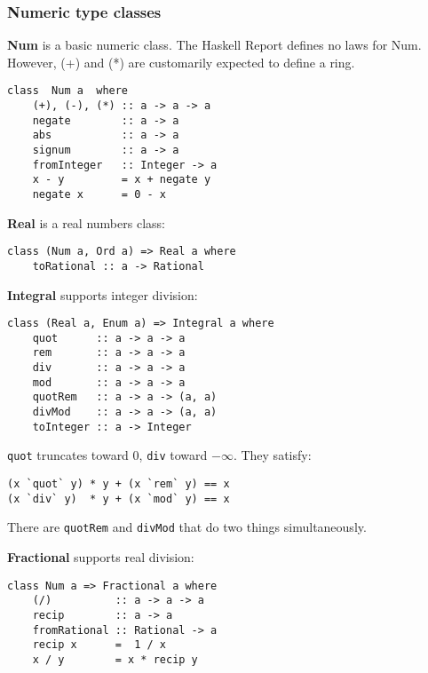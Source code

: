 %

\subsubsection{Numeric type classes}

\textbf{Num} is a basic numeric class.
The Haskell Report defines no laws for Num.
However, (+) and (*) are customarily expected to define a ring.
\begin{verbatim}
class  Num a  where
    (+), (-), (*) :: a -> a -> a
    negate        :: a -> a
    abs           :: a -> a
    signum        :: a -> a
    fromInteger   :: Integer -> a
    x - y         = x + negate y
    negate x      = 0 - x
\end{verbatim}

\textbf{Real} is a real numbers class:
\begin{verbatim}
class (Num a, Ord a) => Real a where
    toRational :: a -> Rational 
\end{verbatim}

\textbf{Integral} supports integer division:
\begin{verbatim}
class (Real a, Enum a) => Integral a where
    quot      :: a -> a -> a
    rem       :: a -> a -> a
    div       :: a -> a -> a
    mod       :: a -> a -> a
    quotRem   :: a -> a -> (a, a) 
    divMod    :: a -> a -> (a, a) 
    toInteger :: a -> Integer 
\end{verbatim}

\texttt{quot} truncates toward $0$, \texttt{div} toward $-\infty$.
They satisfy:
\begin{verbatim}
(x `quot` y) * y + (x `rem` y) == x
(x `div` y)  * y + (x `mod` y) == x
\end{verbatim}

There are \texttt{quotRem} and \texttt{divMod} that do two things simultaneously.

\textbf{Fractional} supports real division:
\begin{verbatim}
class Num a => Fractional a where
    (/)          :: a -> a -> a
    recip        :: a -> a
    fromRational :: Rational -> a
    recip x      =  1 / x
    x / y        = x * recip y
\end{verbatim}





%